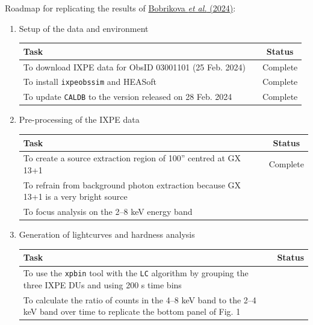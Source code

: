 \newpage
{}
	Roadmap for replicating the results of \href{https://www.aanda.org/articles/aa/pdf/2024/08/aa50207-24.pdf}{Bobrikova \textit{et al.} (2024)}:
	\begin{enumerate}
		\item Setup of the data and environment
		\begin{table}[h!]
			\centering
			\begin{tabular}{p{}cc}
				\toprule
				\textbf{Task} && \textbf{Status} \\
				\toprule
				{\pt{}To download IXPE data for ObsID 03001101 (25 Feb. 2024)} && {Complete} \\
				{\pt{}To install \verb|ixpeobssim| and HEASoft} && {Complete} \\
				{\pt{}To update \verb|CALDB| to the version released on 28 Feb. 2024} && {Complete} \\
				\bottomrule
			\end{tabular}
		\end{table}
		
		\item Pre-processing of the IXPE data
		\begin{table}[h!]
			\centering
			\begin{tabular}{p{}cc}
				\toprule
				\textbf{Task} && \textbf{Status} \\
				\toprule
				{\pt{}To create a source extraction region of 100'' centred at GX 13+1} && {Complete} \\
				{\pt{}To refrain from background photon extraction because GX 13+1 is a very bright source} && {} \\
				{\pt{}To focus analysis on the 2--8 keV energy band} && {} \\
				\bottomrule
			\end{tabular}
		\end{table}
		
		\item Generation of lightcurves and hardness analysis
		\begin{table}[h!]
			\centering
			\begin{tabular}{p{}cc}
				\toprule
				\textbf{Task} && \textbf{Status} \\
				\toprule
				{\pt{}To use the \verb|xpbin| tool with the \verb|LC| algorithm by grouping the three IXPE DUs and using 200 s time bins} && {} \\
				{\pt{}To calculate the ratio of counts in the 4--8 keV band to the 2--4 keV band over time to replicate the bottom panel of Fig. 1} && {} \\
				\bottomrule
			\end{tabular}
		\end{table}
		

\end{enumerate}
